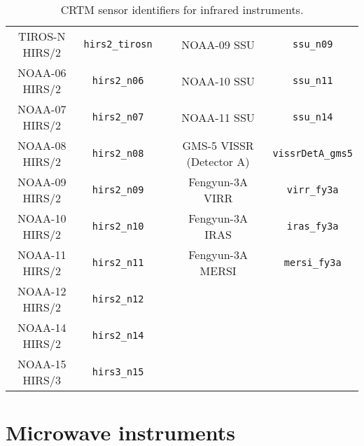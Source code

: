 \begin{table}[htp]
\begin{tabular}{c c c c c}
TIROS-N HIRS/2 & \texttt{hirs2\_tirosn}            & \hspace{0.2cm} & NOAA-09 SSU & \texttt{ssu\_n09}                           \\
NOAA-06 HIRS/2 & \texttt{hirs2\_n06}               & \hspace{0.2cm} & NOAA-10 SSU & \texttt{ssu\_n11}                           \\
NOAA-07 HIRS/2 & \texttt{hirs2\_n07}               & \hspace{0.2cm} & NOAA-11 SSU & \texttt{ssu\_n14}                           \\
NOAA-08 HIRS/2 & \texttt{hirs2\_n08}               & \hspace{0.2cm} & GMS-5 VISSR (Detector A) & \texttt{vissrDetA\_gms5}       \\
NOAA-09 HIRS/2 & \texttt{hirs2\_n09}               & \hspace{0.2cm} & Fengyun-3A VIRR  & \texttt{virr\_fy3a}  \\
NOAA-10 HIRS/2 & \texttt{hirs2\_n10}               & \hspace{0.2cm} & Fengyun-3A IRAS  & \texttt{iras\_fy3a}  \\
NOAA-11 HIRS/2 & \texttt{hirs2\_n11}               & \hspace{0.2cm} & Fengyun-3A MERSI & \texttt{mersi\_fy3a} \\
NOAA-12 HIRS/2 & \texttt{hirs2\_n12}               & \hspace{0.2cm} & & \\
NOAA-14 HIRS/2 & \texttt{hirs2\_n14}               & \hspace{0.2cm} & & \\
NOAA-15 HIRS/3 & \texttt{hirs3\_n15}               & \hspace{0.2cm} & & \\
    \hline
  \end{tabular}
  \caption{CRTM sensor identifiers for infrared instruments.}
  \label{tab:ir_sensor_id}
\end{table}

\clearpage
\section{Microwave instruments}
\label{sec:microwave_instruments_sensor_id}

